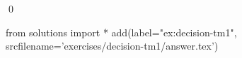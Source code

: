 
\begin{ex} 
  \label{ex:decision-tm1}
  
  \qed
\end{ex} 
\begin{python0}
from solutions import *
add(label="ex:decision-tm1",
    srcfilename='exercises/decision-tm1/answer.tex') 
\end{python0}
